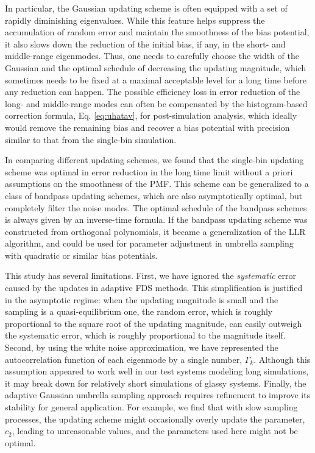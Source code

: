 \documentclass[preprint, superscriptaddress, floatfix]{revtex4-1}
\begin{document}
In particular, the Gaussian updating scheme is often
equipped with a set of rapidly diminishing eigenvalues.
%
While this feature helps suppress
the accumulation of random error and
maintain the smoothness of the bias potential,
it also slows down the reduction
of the initial bias, if any,
in the short- and middle-range eigenmodes.
%
Thus, one needs to carefully choose the width of the Gaussian
and the optimal schedule of decreasing the updating magnitude,
which sometimes needs to be fixed at a maximal acceptable level
for a long time before any reduction can happen.
%
The possible efficiency loss in
error reduction of the long- and middle-range modes
can often be compensated
by the histogram-based correction formula, Eq. \eqref{eq:uhatav},
for post-simulation analysis,
which ideally would remove the remaining bias
and recover a bias potential with precision
similar to that from the single-bin simulation.


In comparing different updating schemes,
we found that
the single-bin updating scheme was optimal
in error reduction
in the long time limit
without a priori assumptions
on the smoothness of the PMF.
%
This scheme can be generalized to
a class of bandpass updating schemes,
which are also asymptotically optimal,
but completely filter the noise modes.
%
The optimal schedule of the bandpass schemes
is always given by an inverse-time formula.
%
If the bandpass updating scheme was constructed
from orthogonal polynomials,
it became a generalization
of the LLR algorithm\cite{langfeld2012, pellegrini2014},
and could be used for parameter adjustment
in umbrella sampling with
quadratic\cite{neuhaus2006, *neuhaus2007, zhu2012}
or similar\cite{kim2010}
bias potentials.



This study has several limitations.
%
First, we have ignored the \emph{systematic}
error\cite{zhou2005, morozov2007, zhou2008}
caused by the updates in adaptive FDS methods.
%
This simplification is justified in the asymptotic regime:
when the updating magnitude is small
and the sampling is a quasi-equilibrium one\cite{
  zhou2005, morozov2007, zhou2008, barducci2008, dama2014},
the random error,
which is roughly proportional to
the square root of the updating magnitude\cite{
  zhou2005, morozov2007, zhou2008, bussi2006},
can easily outweigh
the systematic error,
which is roughly proportional to
the magnitude itself\cite{morozov2007}.
%
%
Second, by using the white noise approximation,
we have represented the autocorrelation function
of each eigenmode by a single number, $\Gamma_k$.
%
Although this assumption appeared to work well
in our test systems modeling long simulations,
it may break down for relatively short simulations
of glassy systems.
%
Finally, the adaptive Gaussian umbrella sampling
approach requires refinement to improve
its stability for general application.
%
For example, we find that with slow sampling processes,
the updating scheme might occasionally overly update
the parameter, $c_2$, leading to unreasonable values,
and the parameters used here might not be optimal.
\end{document}
